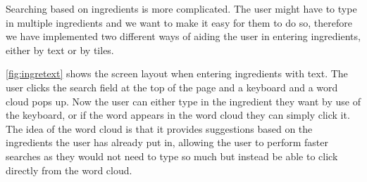 Searching based on ingredients is more complicated. The user might have to type in multiple ingredients and we want to make it easy for them to do so, therefore we have implemented two different ways of aiding the user in entering ingredients, either by text or by tiles.

\autoref{fig:ingretext} shows the screen layout when entering ingredients with text. The user clicks the search field at the top of the page and a keyboard and a word cloud pops up. Now the user can either type in the ingredient they want by use of the keyboard, or if the word appears in the word cloud they can simply click it. The idea of the word cloud is that it provides suggestions based on the ingredients the user has already put in, allowing the user to perform faster searches as they would not need to type so much but instead be able to click directly from the word cloud.

